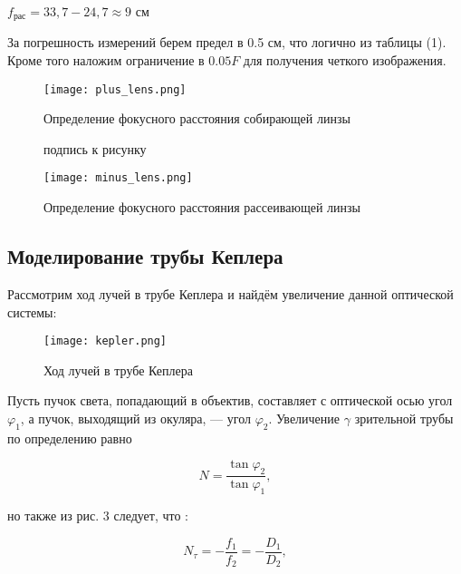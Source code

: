 \begin{center}
    $f_{\text{рас}} = 33,7 - 24,7 \approx 9$ см
\end{center}


За погрешность измерений берем предел в 0.5 см, что логично из таблицы (1). Кроме того наложим ограничение в $0.05F$ для получения четкого изображения.

\begin{figure}[h!]
    \begin{center}
        \begin{minipage}[h!]{0.60\linewidth}
            \texttt{[image: plus\_lens.png]}
            \caption{Определение фокусного расстояния собирающей линзы}  подпись к рисунку
        \label{} 
        \end{minipage}

        \hfill 

        \begin{minipage}[h!]{0.60\linewidth}
            \texttt{[image: minus\_lens.png]}
            \caption{Определение фокусного расстояния рассеивающей линзы}
        \label{}
    \end{minipage}
    \end{center}
\end{figure}

\subsection{Моделирование трубы Кеплера}

Рассмотрим ход лучей в трубе Кеплера и найдём увеличение данной оптической системы:
    
\begin{figure}[h!]
    \centering
        \texttt{[image: kepler.png]}
    \caption{Ход лучей в трубе Кеплера}
    \label{}
\end{figure}

Пусть пучок света, попадающий в объектив, составляет с оптической осью угол $\varphi_1$, а пучок, выходящий из окуляра, — угол $\varphi_2$. Увеличение $\gamma$ зрительной трубы по определению равно

\begin{equation}
    N = \frac{\tan \varphi_2}{\tan \varphi_1},
\end{equation}

но также из рис. 3 следует, что :

\begin{equation}
    N_{\tau} = -\frac{f_1}{f_2} = -\frac{D_1}{D_2},
\end{equation}


